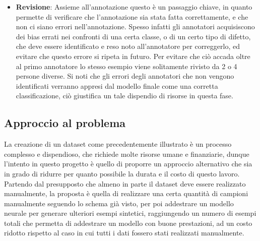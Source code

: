\begin{itemize}
    \item \textbf{Revisione}: Assieme all'annotazione questo è un passaggio chiave, in quanto permette di verificare che l'annotazione sia stata fatta correttamente,
        e che non ci siano errori nell'annotazione. Spesso infatti gli annotatori acquisiscono dei bias errati nei confronti di una certa classe, o di un certo tipo di difetto, 
        che deve essere identificato e reso noto all'annotatore per correggerlo, ed evitare che questo errore si ripeta in futuro.
        Per evitare che ciò accada oltre al primo annotatore lo stesso esempio viene solitamente rivisto da 2 o 4 persone diverse.
        Si noti che gli errori degli annotatori che non vengono identificati verranno appresi dal modello finale come una corretta classificazione, ciò giustifica un tale 
        dispendio di risorse in questa fase.
\end{itemize}

\subsection{Approccio al problema \ok}

La creazione di un dataset come precedentemente illustrato è un processo complesso e dispendioso, che richiede molte risorse umane e finanziarie,
dunque l'intento in questo progetto è quello di proporre un approccio alternativo che sia in grado di ridurre per quanto possibile la durata e il costo
di questo lavoro.
Partendo dal presupposto che almeno in parte il dataset deve essere realizzato manualmente, la proposta è quella di realizzare una certa 
quantità di campioni manualmente seguendo lo schema già visto, per poi addestrare un modello neurale per generare ulteriori esempi sintetici,
raggiungendo un numero di esempi totali che permetta di addestrare un modello con buone prestazioni, ad un costo ridotto rispetto al caso in cui
tutti i dati fossero stati realizzati manualmente.

